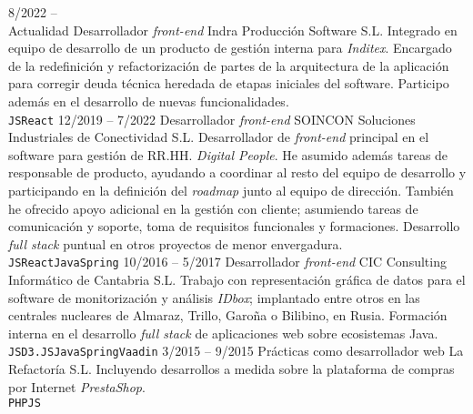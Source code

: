 \documentclass[9pt]{developercv} %
\begin{document}

%
%


\begin{entrylist}
	\entry
		{8/2022 --\\ Actualidad}
		{Desarrollador \emph{front-end}}
		{Indra Producción Software S.L.}
		{Integrado en equipo de desarrollo de un producto de gestión interna para \emph{Inditex}. Encargado de la redefinición y refactorización de partes de la arquitectura de la aplicación para corregir deuda técnica heredada de etapas iniciales del software. Participo además en el desarrollo de nuevas funcionalidades.\\ \texttt{JS}\slashsep\texttt{React}}
	\entry
		{12/2019 -- 7/2022}
		{Desarrollador \emph{front-end}}
		{SOINCON Soluciones Industriales de Conectividad S.L.}
		{Desarrollador de \emph{front-end} principal en el software para gestión de RR.HH. \emph{Digital People}. He asumido además tareas de responsable de producto, ayudando a coordinar al resto del equipo de desarrollo y participando en la definición del \emph{roadmap} junto al equipo de dirección. También he ofrecido apoyo adicional en la gestión con cliente; asumiendo tareas de comunicación y soporte, toma de requisitos funcionales y formaciones. Desarrollo \emph{full stack} puntual en otros proyectos de menor envergadura.\\ \texttt{JS}\slashsep\texttt{React}\slashsep\texttt{Java}\slashsep\texttt{Spring}}
	\entry
		{10/2016 -- 5/2017}
		{Desarrollador \emph{front-end}}
		{CIC Consulting Informático de Cantabria S.L.}
		{Trabajo con representación gráfica de datos para el software de monitorización y análisis \emph{IDbox}; implantado entre otros en las centrales nucleares de Almaraz, Trillo, Garoña o Bilibino, en Rusia. Formación interna en el desarrollo \emph{full stack} de aplicaciones web sobre ecosistemas Java.\\ \texttt{JS}\slashsep\texttt{D3.JS}\slashsep\texttt{Java}\slashsep\texttt{Spring}\slashsep\texttt{Vaadin}}
	\entry
		{3/2015 -- 9/2015}
		{Prácticas como desarrollador web}
		{La Refactoría S.L.}
		{Incluyendo desarrollos a medida sobre la plataforma de compras por Internet \emph{PrestaShop}.\\ \texttt{PHP}\slashsep\texttt{JS}}
\end{entrylist}
\end{document}
